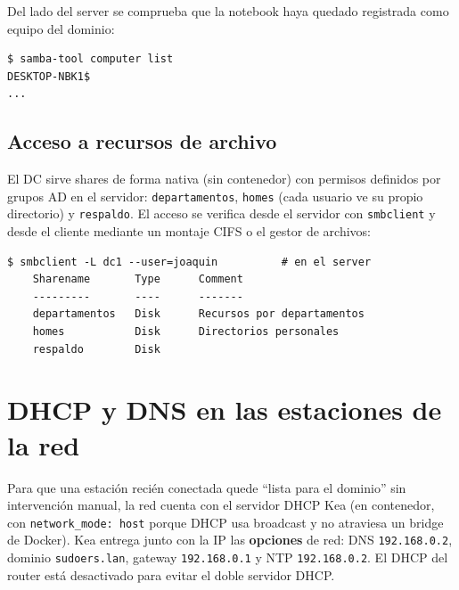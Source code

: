 Del lado del server se comprueba que la notebook haya quedado registrada como
equipo del dominio:

\begin{lstlisting}[style=terminal]
$ samba-tool computer list
DESKTOP-NBK1$
...
\end{lstlisting}


\subsection{Acceso a recursos de archivo}

El DC sirve shares de forma nativa (sin contenedor) con permisos definidos
por grupos AD en el servidor: \texttt{departamentos}, \texttt{homes} (cada
usuario ve su propio directorio) y \texttt{respaldo}. El acceso se verifica
desde el servidor con \texttt{smbclient} y desde el cliente mediante un
montaje CIFS o el gestor de archivos:

\begin{lstlisting}[style=terminal]
$ smbclient -L dc1 --user=joaquin          # en el server
	Sharename       Type      Comment
	---------       ----      -------
	departamentos   Disk      Recursos por departamentos
	homes           Disk      Directorios personales
	respaldo        Disk
\end{lstlisting}


\section{DHCP y DNS en las estaciones de la red}

Para que una estación recién conectada quede ``lista para el dominio'' sin
intervención manual, la red cuenta con el servidor DHCP Kea (en contenedor,
con \texttt{network\_mode: host} porque DHCP usa broadcast y no atraviesa un
bridge de Docker). Kea entrega junto con la IP las \textbf{opciones} de red:
DNS \texttt{192.168.0.2}, dominio \texttt{sudoers.lan}, gateway
\texttt{192.168.0.1} y NTP \texttt{192.168.0.2}. El DHCP del router está
desactivado para evitar el doble servidor DHCP.

